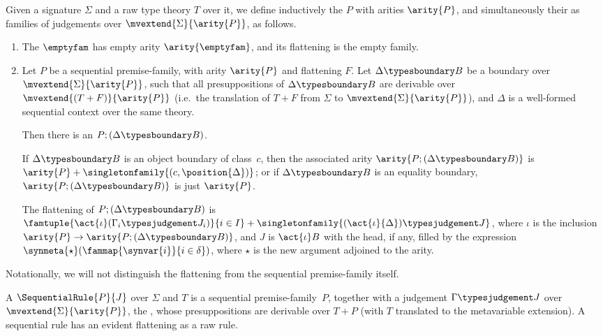 \begin{definition}
  \label{def:sequential-premise-family}%
  Given a signature $\Sigma$ and a raw type theory $T$ over it, we define inductively the  $P$ with arities $\arity{P}$, and simultaneously their  as families of judgements over $\mvextend{\Sigma}{\arity{P}}$, as follows.

  \begin{enumerate}
  \item
    The  $\emptyfam$ has empty arity $\arity{\emptyfam}$, and its flattening is the empty family.
    
  \item
    Let $P$ be a sequential premise-family, with arity $\arity{P}$ and flattening $F$.
    Let $\Delta \typesboundary B$ be a boundary over $\mvextend{\Sigma}{\arity{P}}$, such that all presuppositions of $\Delta \typesboundary B$ are derivable over $\mvextend{(T+F)}{\arity{P}}$ (i.e.\ the translation of $T+F$ from $\Sigma$ to $\mvextend{\Sigma}{\arity{P}}$), and $\Delta$ is a well-formed sequential context over the same theory.

    Then there is an  $P;(\Delta \typesboundary B)$.
    
    If $\Delta \typesboundary B$ is an object boundary of class~$c$, then the associated arity $\arity{P;(\Delta \typesboundary B)}$ is $\arity{P} + \singletonfamily{(c,\position{\Delta})}$; or if $\Delta \typesboundary B$ is an equality boundary, $\arity{P;(\Delta \typesboundary B)}$ is just $\arity{P}$.
    
    The flattening of $P;(\Delta \typesboundary B)$ is $\famtuple{\act{\iota}(\Gamma_i \typesjudgement J_i)}{i \in I} + \singletonfamily{(\act{\iota}{\Delta}) \typesjudgement J}$, where $\iota$ is the inclusion $\arity{P} \to \arity{P;(\Delta \typesboundary B)}$, and $J$ is $\act{\iota}B$
    with the head, if any, filled by the expression $\synmeta{\star}(\fammap{\synvar{i}}{i \in \delta})$, where $\star$ is the new argument adjoined to the arity.
  \end{enumerate}
\end{definition}

\noindent%
Notationally, we will not distinguish the flattening from the sequential premise-family itself.

\begin{definition}
  \label{def:sequential-rule}%
  A  $\SequentialRule{P}{J}$ over $\Sigma$ and $T$ is a sequential premise-family~$P$, together with a judgement $ \Gamma \typesjudgement J$ over $\mvextend{\Sigma}{\arity{P}}$,
  the , whose presuppositions are derivable over $T + P$ (with $T$ translated to the metavariable extension).
  A sequential rule has an evident flattening as a raw rule.
\end{definition}

